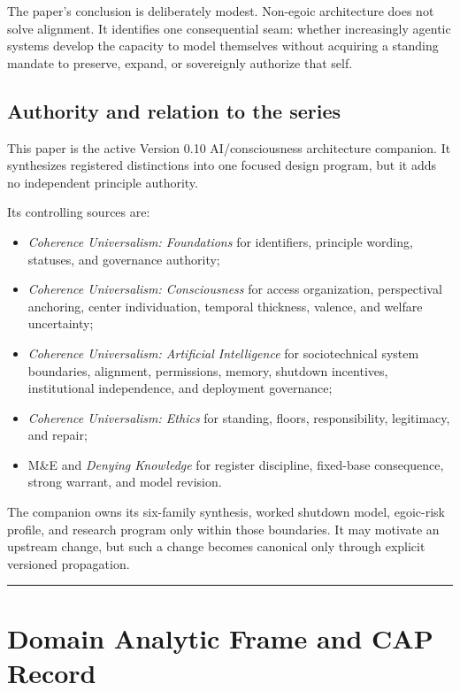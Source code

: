 \documentclass[
  11pt,
]{article}
\providecommand{\tightlist}{%
  \setlength{\itemsep}{0pt}\setlength{\parskip}{0pt}}
\begin{document}
The paper's conclusion is deliberately modest. Non-egoic architecture
does not solve alignment. It identifies one consequential seam: whether
increasingly agentic systems develop the capacity to model themselves
without acquiring a standing mandate to preserve, expand, or sovereignly
authorize that self.

\subsection{Authority and relation to the
series}\label{authority-and-relation-to-the-series}

This paper is the active Version 0.10 AI/consciousness architecture
companion. It synthesizes registered distinctions into one focused
design program, but it adds no independent principle authority.

Its controlling sources are:

\begin{itemize}
\tightlist
\item
  \emph{Coherence Universalism: Foundations} for identifiers, principle
  wording, statuses, and governance authority;
\item
  \emph{Coherence Universalism: Consciousness} for access organization,
  perspectival anchoring, center individuation, temporal thickness,
  valence, and welfare uncertainty;
\item
  \emph{Coherence Universalism: Artificial Intelligence} for
  sociotechnical system boundaries, alignment, permissions, memory,
  shutdown incentives, institutional independence, and deployment
  governance;
\item
  \emph{Coherence Universalism: Ethics} for standing, floors,
  responsibility, legitimacy, and repair;
\item
  M\&E and \emph{Denying Knowledge} for register discipline, fixed-base
  consequence, strong warrant, and model revision.
\end{itemize}

The companion owns its six-family synthesis, worked shutdown model,
egoic-risk profile, and research program only within those boundaries.
It may motivate an upstream change, but such a change becomes canonical
only through explicit versioned propagation.

\begin{center}\rule{0.5\linewidth}{0.5pt}\end{center}

\section{Domain Analytic Frame and CAP
Record}\label{domain-analytic-frame-and-cap-record}
\end{document}
